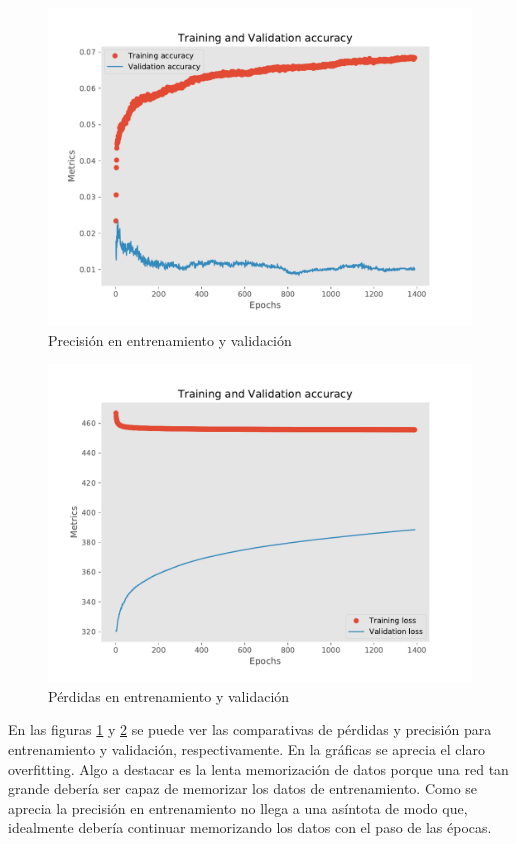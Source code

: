 \begin{figure}[h!]
	\centering
	\includegraphics[width=0.75\columnwidth]{figures/one_to_one_results_acc.pdf}
	\caption{Precisión en entrenamiento y validación}
	\label{fig: results_acc}
\end{figure}
\begin{figure}[t!]
	\centering
	\includegraphics[width=0.75\columnwidth]{figures/one_to_one_results_loss.pdf}
	\caption{Pérdidas en entrenamiento y validación}
	\label{fig: results_loss}
\end{figure}

En las figuras \ref{fig: results_acc} y \ref{fig: results_loss} se puede ver las comparativas de pérdidas y precisión para entrenamiento y validación, respectivamente. En la gráficas se aprecia el claro overfitting. Algo a destacar es la lenta memorización de datos porque una red tan grande debería ser capaz de memorizar los datos de entrenamiento. Como se aprecia la precisión en entrenamiento no llega a una asíntota de modo que, idealmente debería continuar memorizando los datos con el paso de las épocas.